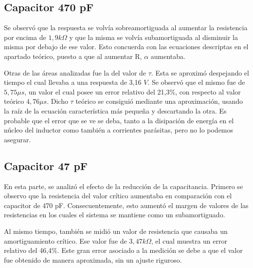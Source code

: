 \documentclass{article}
\begin{document}
        \subsection*{Capacitor 470 pF}
    	Se observó que la respuesta se volvía sobreamortiguada al aumentar la resistencia
     por encima de $1,9 k\Omega$ y que la misma se volvía subamortiguada al disminuir la misma por 
     debajo de ese valor. Esto concuerda con las ecuaciones descriptas en el apartado teórico, puesto 
     a que al aumentar R, $\alpha$ aumentaba. \par
	Otras de las áreas analizadas fue la del valor de $\tau$. Esta se aproximó despejando el tiempo 
    el cual llevaba a una respuesta de 3,16 $V$. Se observó que el mismo fue de $5,75 \mu s$, un valor
     el cual posee un error relativo del 21,3\%, con respecto al valor teórico $4,76 \mu s$. Dicho $\tau$
      teórico se consiguió mediante una aproximación, usando la raíz de la ecuación característica más pequeña 
      y descartando la otra. Es probable que el error que se ve se deba, tanto a la disipación de energía en el núcleo del inductor como también a corrientes parásitas, pero no lo podemos asegurar.\par
	
	
	
        \subsection*{Capacitor 47 pF}
        En esta parte, se analizó el efecto de la reducción de la capacitancia. Primero se observo que la resistencia del valor crítico aumentaba en comparación con el capacitor de 470 pF. Consecuentemente, esto aumentó el margen de valores de las resistencias en los cuales el sistema se mantiene como un subamortiguado.\par
        Al mismo tiempo, también se midió un valor de resistencia que causaba un amortiguamiento crítico. Ese valor fue de $3,47 k\Omega$, el cual muestra un error relativo del 46,4\%. Este gran error asociado a la medición se debe a que el valor fue obtenido de manera aproximada, sin un ajuste riguroso.\par 
        
\end{document}
